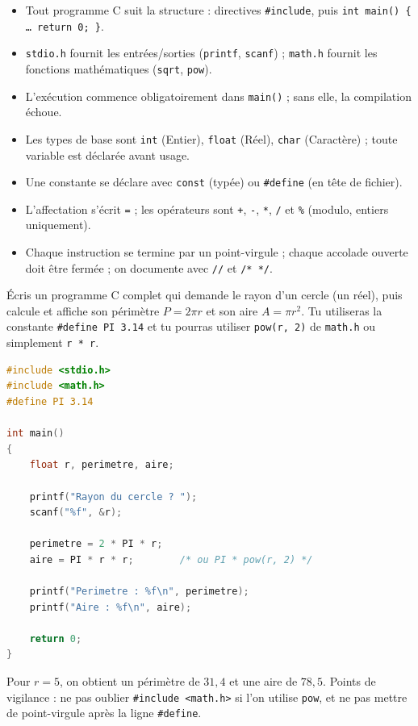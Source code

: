 \documentclass[11pt]{article}
\begin{document}
\begin{aretenir}
\begin{itemize}
\item Tout programme C suit la structure : directives \texttt{\#include}, puis \texttt{int main() \{ \ldots{} return 0; \}}.
\item \texttt{stdio.h} fournit les entrées/sorties (\texttt{printf}, \texttt{scanf}) ; \texttt{math.h} fournit les fonctions mathématiques (\texttt{sqrt}, \texttt{pow}).
\item L'exécution commence obligatoirement dans \texttt{main()} ; sans elle, la compilation échoue.
\item Les types de base sont \texttt{int} (Entier), \texttt{float} (Réel), \texttt{char} (Caractère) ; toute variable est déclarée avant usage.
\item Une constante se déclare avec \texttt{const} (typée) ou \texttt{\#define} (en tête de fichier).
\item L'affectation s'écrit \texttt{=} ; les opérateurs sont \texttt{+}, \texttt{-}, \texttt{*}, \texttt{/} et \texttt{\%} (modulo, entiers uniquement).
\item Chaque instruction se termine par un point-virgule ; chaque accolade ouverte doit être fermée ; on documente avec \texttt{//} et \texttt{/* */}.
\end{itemize}
\end{aretenir}

\begin{exercice}
Écris un programme C complet qui demande le rayon d'un cercle (un réel), puis calcule et affiche son périmètre $P = 2\pi r$ et son aire $A = \pi r^{2}$. Tu utiliseras la constante \texttt{\#define PI 3.14} et tu pourras utiliser \texttt{pow(r, 2)} de \texttt{math.h} ou simplement \texttt{r * r}.
\end{exercice}

\begin{corrige}[Exercice 1]
\begin{lstlisting}[language=C]
#include <stdio.h>
#include <math.h>
#define PI 3.14

int main()
{
    float r, perimetre, aire;

    printf("Rayon du cercle ? ");
    scanf("%f", &r);

    perimetre = 2 * PI * r;
    aire = PI * r * r;        /* ou PI * pow(r, 2) */

    printf("Perimetre : %f\n", perimetre);
    printf("Aire : %f\n", aire);

    return 0;
}
\end{lstlisting}
Pour $r = 5$, on obtient un périmètre de $31{,}4$ et une aire de $78{,}5$. Points de vigilance : ne pas oublier \texttt{\#include <math.h>} si l'on utilise \texttt{pow}, et ne pas mettre de point-virgule après la ligne \texttt{\#define}.
\end{corrige}
\end{document}
